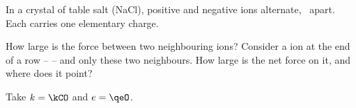 In a crystal of table salt (NaCl), positive  and negative  ions alternate, \dnO\ apart. Each carries one elementary charge.

\begin{abcliste}
\abc How large is the force between two neighbouring ions?
\abc Consider a  ion at the end of a row  --  --  and only these two neighbours. How large is the net force on it, and where does it point?
\end{abcliste}

Take $k = \kCO$ and $e = \qeO$.
